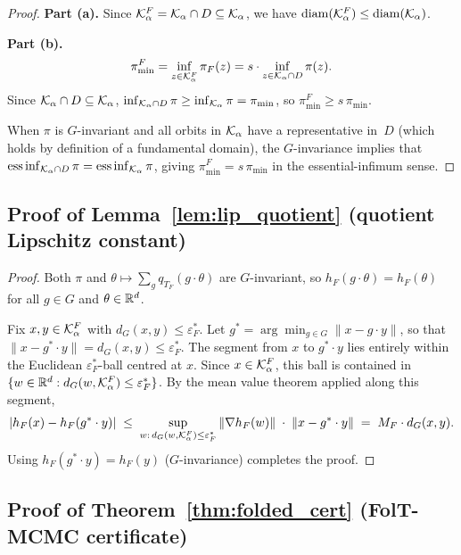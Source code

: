 \begin{proof}
  \textbf{Part (a).}
  Since $\mathcal{K}_\alpha^F = \mathcal{K}_\alpha \cap D \subseteq \mathcal{K}_\alpha$,
  we have $\mathrm{diam}(\mathcal{K}_\alpha^F) \leq \mathrm{diam}(\mathcal{K}_\alpha)$.

  \textbf{Part (b).}
  \[
    \pi_{\min}^F
    = \inf_{z \in \mathcal{K}_\alpha^F} \pi_F(z)
    = s \cdot \inf_{z \in \mathcal{K}_\alpha \cap D} \pi(z).
  \]
  Since $\mathcal{K}_\alpha \cap D \subseteq \mathcal{K}_\alpha$,
  $\inf_{\mathcal{K}_\alpha \cap D} \pi \geq \inf_{\mathcal{K}_\alpha} \pi
  = \pi_{\min}$,
  so $\pi_{\min}^F \geq s\,\pi_{\min}$.

  When $\pi$ is $G$-invariant and all orbits in $\mathcal{K}_\alpha$
  have a representative in~$D$ (which holds by definition of a
  fundamental domain), the $G$-invariance implies that
  $\operatorname{ess\,inf}_{\mathcal{K}_\alpha \cap D} \pi
  = \operatorname{ess\,inf}_{\mathcal{K}_\alpha} \pi$,
  giving $\pi_{\min}^F = s\,\pi_{\min}$ in the essential-infimum
  sense.
\end{proof}


\subsection{Proof of Lemma~\ref{lem:lip_quotient}
  (quotient Lipschitz constant)}
\label{app:proof_lip}

\begin{proof}
  Both $\pi$ and $\theta \mapsto \sum_g q_{T_F}(g \cdot \theta)$
  are $G$-invariant, so $h_F(g \cdot \theta) = h_F(\theta)$ for
  all $g \in G$ and $\theta \in \mathbb{R}^d$.

  Fix $x, y \in \mathcal{K}_\alpha^F$ with $d_G(x,y) \leq \varepsilon_F^*$.
  Let $g^* = \arg\min_{g \in G} \|x - g \cdot y\|$, so that
  $\|x - g^* \cdot y\| = d_G(x,y) \leq \varepsilon_F^*$.
  The segment from $x$ to $g^* \cdot y$ lies entirely within the
  Euclidean $\varepsilon_F^*$-ball centred at $x$.  Since
  $x \in \mathcal{K}_\alpha^F$, this ball is contained in
  $\{w \in \mathbb{R}^d : d_G(w, \mathcal{K}_\alpha^F) \leq \varepsilon_F^*\}$.
  By the mean value theorem applied along this segment,
  \[
    |h_F(x) - h_F(g^* \cdot y)|
    \;\leq\;
    \sup_{w:\, d_G(w, \mathcal{K}_\alpha^F) \leq \varepsilon_F^*}
    \|\nabla h_F(w)\|
    \;\cdot\;
    \|x - g^* \cdot y\|
    \;=\;
    M_F \cdot d_G(x, y).
  \]
  Using $h_F(g^* \cdot y) = h_F(y)$ ($G$-invariance) completes the proof.
\end{proof}


\subsection{Proof of Theorem~\ref{thm:folded_cert}
  (FolT-MCMC certificate)}
\label{app:proof_cert}

